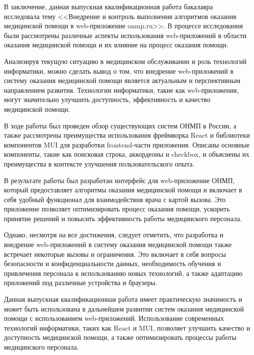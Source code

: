 \conclusion

В заключение, данная выпускная квалификационная работа бакалавра исследовала тему <<Внедрение и контроль выполнения алгоритмов оказания медицинской помощи в web-приложение onmp.ru>>. В процессе исследования были рассмотрены различные аспекты использования web-приложений в области оказания медицинской помощи и их влияние на процесс оказания помощи.

Анализируя текущую ситуацию в медицинском обслуживании и роль технологий информатики, можно сделать вывод о том, что внедрение web-приложений в систему оказания медицинской помощи является актуальным и перспективным направлением развития. Технологии информатики, такие как web-приложения, могут значительно улучшить доступность, эффективность и качество медицинской помощи.

В ходе работы был проведен обзор существующих систем ОНМП в России, а также рассмотрены преимущества использования фреймворка React и библиотеки компонентов MUI для разработки frontend-части приложения. Описаны основные компоненты, такие как поисковая строка, аккордеоны и checkbox, и объяснены их преимущества в контексте улучшения пользовательского опыта.

В результате работы был разработан интерфейс для web-приложение ОНМП, который предоставляет алгоритмы оказания медицинской помощи и включает в себя удобный функционал для взаимодействия врача с картой вызова. Это приложение позволяет оптимизировать процесс оказания помощи, ускорить принятие решений и повысить эффективность работы медицинского персонала.

Однако, несмотря на все достижения, следует отметить, что разработка и внедрение web-приложений в систему оказания медицинской помощи также встречает некоторые вызовы и ограничения. Это включает в себя вопросы безопасности и конфиденциальности данных, необходимость обучения и привлечения персонала к использованию новых технологий, а также адаптацию приложений под различные устройства и браузеры.

Данная выпускная квалификационная работа имеет практическую значимость и может быть использована в дальнейшем развитии систем оказания медицинской помощи с использованием web-приложений. Использование современных технологий информатики, таких как React и MUI, позволяет улучшить качество и доступность медицинской помощи, а также оптимизировать процессы работы медицинского персонала.